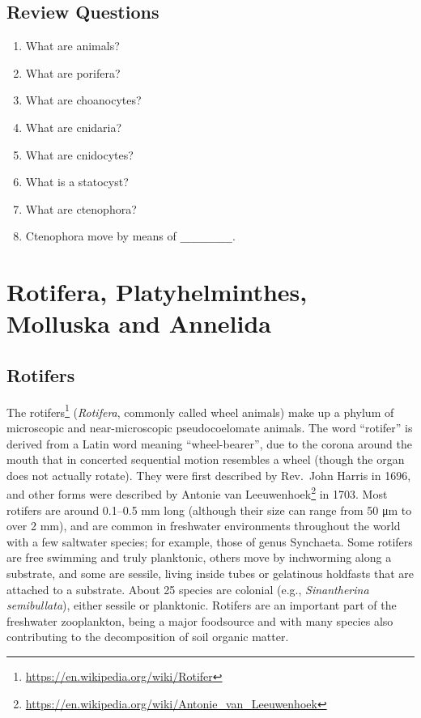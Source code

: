 \documentclass[]{book}
\providecommand{\tightlist}{%
  \setlength{\itemsep}{0pt}\setlength{\parskip}{0pt}}
\let\rmarkdownfootnote\footnote%
\def\footnote{\protect\rmarkdownfootnote}
\renewcommand{\href}[2]{#2\footnote{\url{#1}}}
\begin{document}
\hypertarget{review-questions-3}{%
\section{Review Questions}\label{review-questions-3}}

\begin{enumerate}
\def\labelenumi{\arabic{enumi}.}
\tightlist
\item
  What are animals?
\item
  What are porifera?
\item
  What are choanocytes?
\item
  What are cnidaria?
\item
  What are cnidocytes?
\item
  What is a statocyst?
\item
  What are ctenophora?
\item
  Ctenophora move by means of \texttt{\_\_\_\_\_\_\_\_\_}.
\end{enumerate}

\hypertarget{rotifera-platyhelminthes-molluska-and-annelida}{%
\chapter{Rotifera, Platyhelminthes, Molluska and Annelida}\label{rotifera-platyhelminthes-molluska-and-annelida}}

\hypertarget{rotifers}{%
\section{Rotifers}\label{rotifers}}

The \href{https://en.wikipedia.org/wiki/Rotifer}{rotifers} (\emph{Rotifera}, commonly called wheel animals) make up a phylum of microscopic and near-microscopic pseudocoelomate animals. The word ``rotifer'' is derived from a Latin word meaning ``wheel-bearer'', due to the corona around the mouth that in concerted sequential motion resembles a wheel (though the organ does not actually rotate).
They were first described by Rev.~John Harris in 1696, and other forms were described by \href{https://en.wikipedia.org/wiki/Antonie_van_Leeuwenhoek}{Antonie van Leeuwenhoek} in 1703. Most rotifers are around 0.1--0.5 mm long (although their size can range from 50 μm to over 2 mm), and are common in freshwater environments throughout the world with a few saltwater species; for example, those of genus Synchaeta.
Some rotifers are free swimming and truly planktonic, others move by inchworming along a substrate, and some are sessile, living inside tubes or gelatinous holdfasts that are attached to a substrate. About 25 species are colonial (e.g., \emph{Sinantherina semibullata}), either sessile or planktonic. Rotifers are an important part of the freshwater zooplankton, being a major foodsource and with many species also contributing to the decomposition of soil organic matter.
\end{document}
